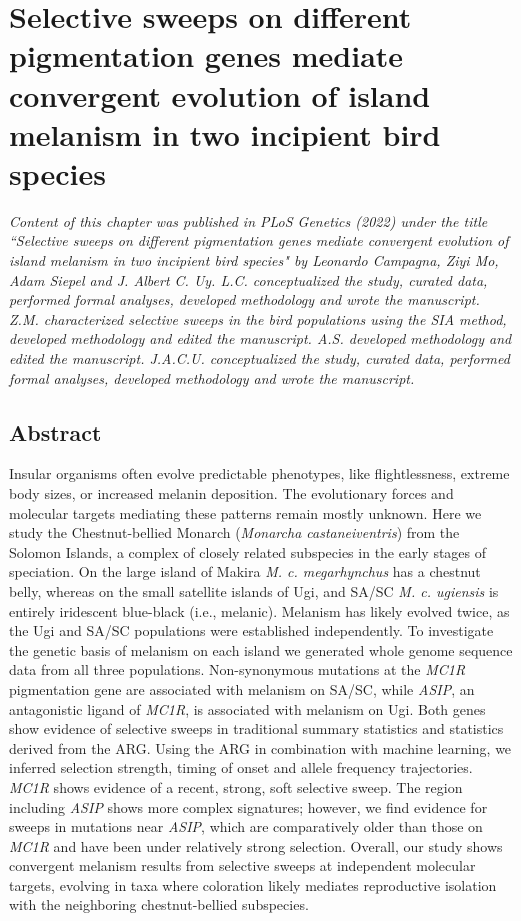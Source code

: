 \chapter{Selective sweeps on different pigmentation genes mediate convergent evolution of island melanism in two incipient bird species} \label{chapter3}

\textit{Content of this chapter was published in PLoS Genetics (2022) under the title ``Selective sweeps on different pigmentation genes mediate convergent evolution of island melanism in two incipient bird species" by Leonardo Campagna, Ziyi Mo, Adam Siepel and J. Albert C. Uy. L.C. conceptualized the study, curated data, performed formal analyses, developed methodology and wrote the manuscript. Z.M. characterized selective sweeps in the bird populations using the SIA method, developed methodology and edited the manuscript. A.S. developed methodology and edited the manuscript. J.A.C.U. conceptualized the study, curated data, performed formal analyses, developed methodology and wrote the manuscript.}

\section{Abstract}

Insular organisms often evolve predictable phenotypes, like flightlessness, extreme body sizes, or increased melanin deposition. The evolutionary forces and molecular targets mediating these patterns remain mostly unknown. Here we study the Chestnut-bellied Monarch (\textit{Monarcha castaneiventris}) from the Solomon Islands, a complex of closely related subspecies in the early stages of speciation. On the large island of Makira \textit{M. c. megarhynchus} has a chestnut belly, whereas on the small satellite islands of Ugi, and \ac{SA/SC} \textit{M. c. ugiensis} is entirely iridescent blue-black (i.e., melanic). Melanism has likely evolved twice, as the Ugi and \ac{SA/SC} populations were established independently. To investigate the genetic basis of melanism on each island we generated whole genome sequence data from all three populations. Non-synonymous mutations at the \textit{MC1R} pigmentation gene are associated with melanism on \ac{SA/SC}, while \textit{ASIP}, an antagonistic ligand of \textit{MC1R}, is associated with melanism on Ugi. Both genes show evidence of selective sweeps in traditional summary statistics and statistics derived from the \acf{ARG}. Using the \ac{ARG} in combination with machine learning, we inferred selection strength, timing of onset and allele frequency trajectories. \textit{MC1R} shows evidence of a recent, strong, soft selective sweep. The region including \textit{ASIP} shows more complex signatures; however, we find evidence for sweeps in mutations near \textit{ASIP}, which are comparatively older than those on \textit{MC1R} and have been under relatively strong selection. Overall, our study shows convergent melanism results from selective sweeps at independent molecular targets, evolving in taxa where coloration likely mediates reproductive isolation with the neighboring chestnut-bellied subspecies.

